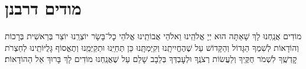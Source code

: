 \documentclass[twoside, openany, parskip=half, 11pt]{book}
\begin{document}

\endgroup
\begingroup
\let\clearpage\relax

\endgroup
\clearpage
\begingroup
\let\clearpage\relax

\endgroup

\chapter[מודים דרבנן]{ מודים דרבנן }
מוֹדִים אֲנַֽחְנוּ לָךְ שָׁאַתָּה הוּא יְיָ אֱלֹהֵֽינוּ וֵאלֹהֵי אֲבוֹתֵֽינוּ \middot אֱלֹהֵי כׇל־בָּשָׂר יוֹצְרֵֽנוּ יוֹצֵר בְּרֵאשִׁית \middot בְּרָכוֹת וְהוֹדָאוֹת לְשִׁמְךָ הַגָּדוֹל וְהַקָּדוֹשׁ עַל שֶׁהֶחֱיִיתָֽנוּ וְקִיַּמְתָּֽנוּ \middot כֵּן תְּחַיֵּֽנוּ וּתְקַיְּמֵֽנוּ וְתֶאֱסוֹף גָּלֻיּוֹתֵֽינוּ לְחַצְרֹת קׇדְשֶֽׁךָ לִשְׁמֹר חֻקֶּֽיךָ וְלַעֲשׂוֹת רְצֹנֶֽךָ וּלְעׇבְדְּךָ בְּלֵבָב שָׁלֵם \middot עַל שֶׁאֲנַֽחְנוּ מוֹדִים לָךְ \middot בָּרוּךְ אֵל הַהוֹדָאוֹת׃
\end{document}
